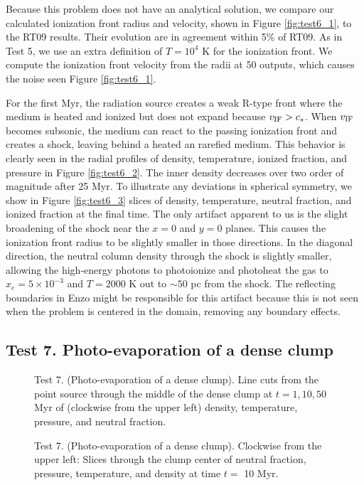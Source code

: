 \documentclass[apj,onecolumn]{emulateapj}
\begin{document}
Because this problem does not have an analytical solution, we compare
our calculated ionization front radius and velocity, shown in Figure
\ref{fig:test6_1}, to the RT09 results.  Their evolution are in
agreement within 5\% of RT09.  As in Test 5, we use an extra
definition of $T=10^4$ K for the ionization front.  We compute the
ionization front velocity from the radii at 50 outputs, which causes
the noise seen Figure \ref{fig:test6_1}.

For the first Myr, the radiation source creates a weak R-type front
where the medium is heated and ionized but does not expand because
$v_{\rm IF} > c_s$.  When $v_{\rm IF}$ becomes subsonic, the medium
can react to the passing ionization front and creates a shock, leaving
behind a heated an rarefied medium.  This behavior is clearly seen in
the radial profiles of density, temperature, ionized fraction, and
pressure in Figure \ref{fig:test6_2}.  The inner density decreases
over two order of magnitude after 25 Myr.  To illustrate any
deviations in spherical symmetry, we show in Figure \ref{fig:test6_3}
slices of density, temperature, neutral fraction, and ionized fraction
at the final time.  The only artifact apparent to us is the slight
broadening of the shock near the $x=0$ and $y=0$ planes.  This causes
the ionization front radius to be slightly smaller in those
directions.  In the diagonal direction, the neutral column density
through the shock is slightly smaller, allowing the high-energy
photons to photoionize and photoheat the gas to $x_e = 5 \times
10^{-3}$ and $T = 2000$ K out to $\sim50$ pc from the shock.  The
reflecting boundaries in Enzo might be responsible for this artifact
because this is not seen when the problem is centered in the domain,
removing any boundary effects.

\subsection{Test 7. Photo-evaporation of a dense clump}

\begin{figure}[t]
  \caption{\label{fig:test7_1} Test 7. (Photo-evaporation of a dense
    clump).  Line cuts from the point source through the middle of the
    dense clump at $t = 1, 10, 50$ Myr of (clockwise from the upper
    left) density, temperature, pressure, and neutral fraction.}
\end{figure}

\begin{figure}[t]
  \caption{\label{fig:test7_2} Test 7. (Photo-evaporation of a dense
    clump).  Clockwise from the upper left: Slices through the clump
    center of neutral fraction, pressure, temperature, and density at
    time $t =$ 10 Myr.}
\end{figure}
\end{document}
